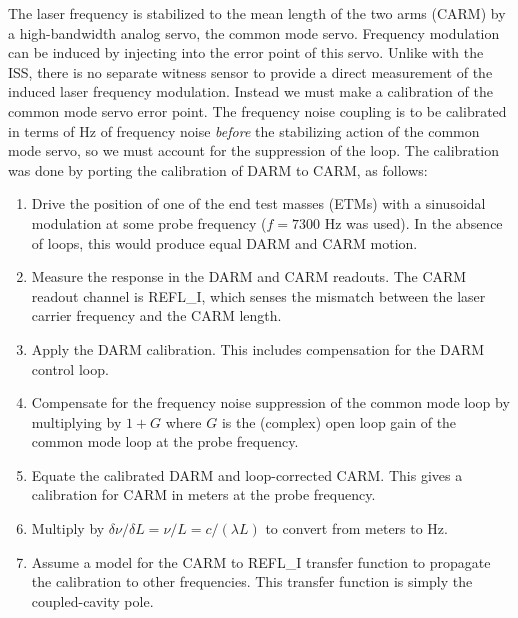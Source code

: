 The laser frequency is stabilized to the mean length of the two arms
(CARM) by a high-bandwidth analog servo, the common mode servo.
Frequency modulation can be induced by injecting into the error point
of this servo.  Unlike with the ISS, there is no separate witness
sensor to provide a direct measurement of the induced laser frequency
modulation.  Instead we must make a calibration of the common mode
servo error point.  The frequency noise coupling is to be calibrated
in terms of Hz of frequency noise \emph{before} the stabilizing action
of the common mode servo, so we must account for the suppression of
the loop.  The calibration was done by porting the calibration of DARM
to CARM, as follows:

\begin{enumerate}
\item Drive the position of one of the end test masses (ETMs) with a
  sinusoidal modulation at some probe frequency ($f=7300$ Hz was
  used).  In the absence of loops, this would produce equal DARM and
  CARM motion.
\item Measure the response in the DARM and CARM readouts.  The CARM
  readout channel is REFL\_I, which senses the mismatch between the
  laser carrier frequency and the CARM length.
\item Apply the DARM calibration.  This includes compensation for the
  DARM control loop.
\item Compensate for the frequency noise suppression of the common
  mode loop by multiplying by $1+G$ where $G$ is the (complex) open
  loop gain of the common mode loop at the probe frequency.
\item Equate the calibrated DARM and loop-corrected CARM.  This gives
  a calibration for CARM in meters at the probe frequency.
\item Multiply by $\delta\nu/\delta L = \nu/L = c/(\lambda L)$ to
  convert from meters to Hz.
\item Assume a model for the CARM to REFL\_I transfer function to
  propagate the calibration to other frequencies.  This transfer
  function is simply the coupled-cavity pole\cite[eq. 3.5]{RanaThesis}.
\end{enumerate}

